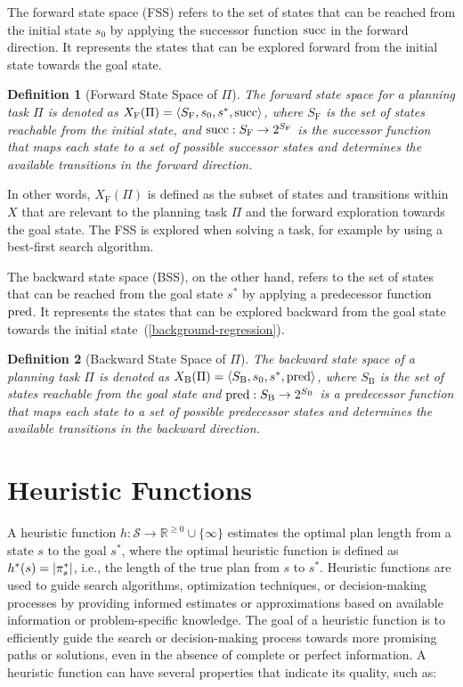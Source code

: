 \documentclass[ppgc,diss,english]{iiufrgs}
\newtheorem{definition}{Definition}
\begin{document}
The forward state space (FSS) refers to the set of states that can be reached from the initial state $s_0$ by applying the successor function $\operatorname{succ}$ in the forward direction. It represents the states that can be explored forward from the initial state towards the goal state.

\begin{definition}[Forward State Space of $\Pi$]
The forward state space for a planning task $\Pi$ is denoted as $X_{\text{F}}(\Pi) = \langle S_{\text{F}}, s_0, s^{*}, \operatorname{succ} \rangle$, where $S_{\text{F}}$ is the set of states reachable from the initial state, and $\operatorname{succ} : S_{\text{F}} \to 2^{S_{\text{F}}}$ is the successor function that maps each state to a set of possible successor states and determines the available transitions in the forward direction.
\end{definition}

In other words, $X_{\text{F}}(\Pi)$ is defined as the subset of states and transitions within $X$ that are relevant to the planning task $\Pi$ and the forward exploration towards the goal state. The FSS is explored when solving a task, for example by using a best-first search algorithm.

The backward state space (BSS), on the other hand, refers to the set of states that can be reached from the goal state $s^{*}$ by applying a predecessor function $\operatorname{pred}$. It represents the states that can be explored backward from the goal state towards the initial state~(\cref{background-regression}).

\begin{definition}[Backward State Space of $\Pi$]
 The backward state space of a planning task $\Pi$ is denoted as $X_{\text{B}}(\Pi) = \langle S_{\text{B}}, s_{0}, s^{*}, \operatorname{pred} \rangle$, where $S_{\text{B}}$ is the set of states reachable from the goal state and $\operatorname{pred} : S_{\text{B}} \to 2^{S_{\text{B}}}$ is a predecessor function that maps each state to a set of possible predecessor states and determines the available transitions in the backward direction.
\end{definition}


\section{Heuristic Functions}
\label{sec:background-heuristics}
A heuristic function $h:\mathcal{S}\rightarrow \mathbb{R}^{\geq 0}\cup\{\infty\}$ estimates the optimal plan length from a state $s$ to the goal $s^*$, where the optimal heuristic function is defined as $h^{*}(s) = |\pi_{s}^{*}|$, i.e., the length of the true plan from $s$ to $s^{*}$. Heuristic functions are used to guide search algorithms, optimization techniques, or decision-making processes by providing informed estimates or approximations based on available information or problem-specific knowledge. The goal of a heuristic function is to efficiently guide the search or decision-making process towards more promising paths or solutions, even in the absence of complete or perfect information. A heuristic function can have several properties that indicate its quality, such as:
\end{document}
